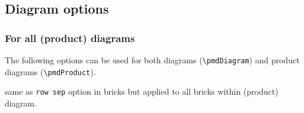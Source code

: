 \documentclass{ltxdoc}
\begin{document}
\begin{center}
\end{center}

\subsection{Diagram options} \label{sec: diagram/options}

\subsubsection{For all (product) diagrams}  \label{sec: diagram/options all}

The following options can be used for both diagrams (\verb`\pmdDiagram`) and product diagrams (\verb`\pmdProduct`).

same as \texttt{row sep} option in bricks but applied to all bricks within (product) diagram.
\end{document}
